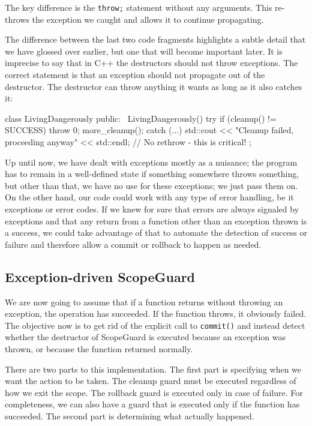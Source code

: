 The key difference is the \texttt{throw;} statement without any arguments. This re-throws the exception we caught and allows it to continue propagating.

The difference between the last two code fragments highlights a subtle detail that we have glossed over earlier, but one that will become important later. It is imprecise to say that in C++ the destructors should not throw exceptions. The correct statement is that an exception should not propagate out of the destructor. The destructor can throw anything it wants as long as it also catches it:

\begin{code}
class LivingDangerously {
  public:
  ~LivingDangerously() {
    try {
      if (cleanup() != SUCCESS) throw 0;
       more_cleanup();
    } catch (...) {
      std::cout << "Cleanup failed, proceeding anyway" <<
      std::endl;
      // No rethrow - this is critical!
    }
  }
};
\end{code}

Up until now, we have dealt with exceptions mostly as a nuisance; the program has to remain in a well-defined state if something somewhere throws something, but other than that, we have no use for these exceptions; we just pass them on. On the other hand, our code could work with any type of error handling, be it exceptions or error codes. If we knew for sure that errors are always signaled by exceptions and that any return from a function other than an exception thrown is a success, we could take advantage of that to automate the detection of success or failure and therefore allow a commit or rollback to happen as needed.

\subsection{Exception-driven ScopeGuard}

We are now going to assume that if a function returns without throwing an exception, the operation has succeeded. If the function throws, it obviously failed. The objective now is to get rid of the explicit call to \texttt{commit()} and instead detect whether the destructor of ScopeGuard is executed because an exception was thrown, or because the function returned normally.

There are two parts to this implementation. The first part is specifying when we want the action to be taken. The cleanup guard must be executed regardless of how we exit the scope. The rollback guard is executed only in case of failure. For completeness, we can also have a guard that is executed only if the function has succeeded. The second part is determining what actually happened.

